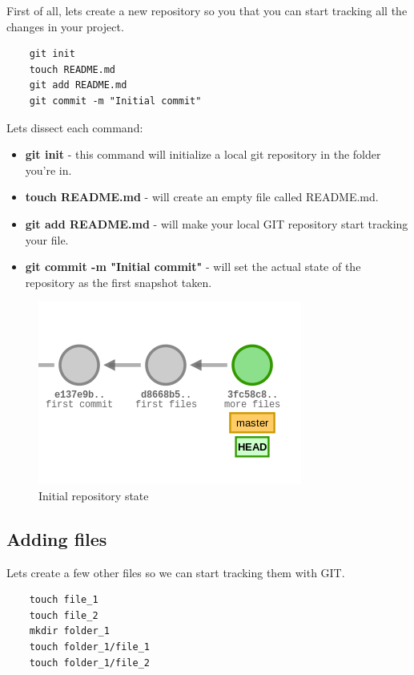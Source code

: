 \documentclass{article}
\begin{document}
First of all, lets create a new repository so you that you can start tracking all the changes in your project.

\begin{lstlisting}
	git init
	touch README.md
	git add README.md
	git commit -m "Initial commit"
\end{lstlisting}

Lets dissect each command:\\

\begin{itemize}
\item{\textbf{git init} - this command will initialize a local git repository in the folder you're in.}
\item{\textbf{touch README.md} - will create an empty file called README.md.}
\item{\textbf{git add README.md} - will make your local GIT repository start tracking your file.}
\item{\textbf{git commit -m "Initial commit"} - will set the actual state of the repository as the first snapshot taken.}
\end{itemize}

\begin{figure}[H]
\centerline{\includegraphics[scale=0.5]{initial_repository.png}}
\caption{Initial repository state}
\label{fig1}
\end{figure}

\subsection{Adding files}

Lets create a few other files so we can start tracking them with GIT.

\begin{lstlisting}
	touch file_1
	touch file_2
	mkdir folder_1
	touch folder_1/file_1
	touch folder_1/file_2
\end{lstlisting}
\end{document}
